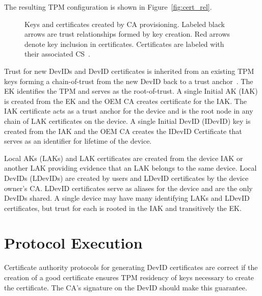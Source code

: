 \documentclass[runningheads]{llncs}
\begin{document}
\noindent The resulting TPM configuration is shown in
Figure~\ref{fig:cert_rel}.

\begin{figure}[hbtp]
  \centering
  
  \caption{Keys and certificates created by CA provisioning. Labeled
    black arrows are trust relationships formed by key creation.  Red
    arrows denote key inclusion in certificates. Certificates are
    labeled with their associated CS~\citep{DevIDSpec-TCG}.}
  \label{fig:cert-rel}
\end{figure}


Trust for new DevIDs and DevID certificates is inherited from an
existing TPM keys forming a chain-of-trust from the new DevID back to
a trust anchor~\citep{DevIDSpec-TCG}. The EK identifies the TPM and
serves as the root-of-trust.  A single Initial AK (IAK) is created
from the EK and the OEM CA creates certificate for the IAK.  The IAK
certificate acts as a trust anchor for the device and is the root node
in any chain of LAK certificates on the device.  A single Initial
DevID (IDevID) key is created from the IAK and the OEM CA creates the
IDevID Certificate that serves as an identifier for lifetime of the
device.

Local AKs (LAKs) and LAK certificates are created from the device IAK
or another LAK providing evidence that an LAK belongs to the same
device.  Local DevIDs (LDevIDs) are created by users and LDevID
certificates by the device owner's CA. LDevID certificates serve as
aliases for the device and are the only DevIDs shared.  A single
device may have many identifying LAKs and LDevID certificates, but
trust for each is rooted in the IAK and transitively the EK.

\section{Protocol Execution}

Certificate authority protocols for generating DevID certificates are
correct if the creation of a good certificate ensures TPM residency of
keys necessary to create the certificate.  The CA's signature on the
DevID should make this guarantee.
\end{document}
